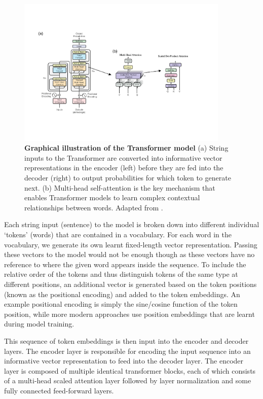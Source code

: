 \begin{figure}[ht]
\centering 
\includegraphics[width=0.9\textwidth]{Chapters/Background/Figs/transformer.pdf}
\caption{\textbf{Graphical illustration of the Transformer model} (a) String inputs to the Transformer are converted into informative vector representations in the encoder (left) before they are fed into the decoder (right) to output probabilities for which token to generate next. (b) Multi-head self-attention is the key mechanism that enables Transformer models to learn complex contextual relationships between words. Adapted from \cite{Vaswani2017}.}
\label{fig:transformer}
\end{figure}

Each string input (sentence) to the model is broken down into different individual `tokens' (words) that are contained in a vocabulary. For each word in the vocabulary, we generate its own learnt fixed-length vector representation. Passing these vectors to the model would not be enough though as these vectors have no reference to where the given word appears inside the sequence. To include the relative order of the tokens and thus distinguish tokens of the same type at different positions, an additional vector is generated based on the token positions (known as the positional encoding) and added to the token embeddings. An example positional encoding is simply the sine/cosine function of the token position, while more modern approaches use position embeddings that are learnt during model training.

This sequence of token embeddings is then input into the encoder and decoder layers. The encoder layer is responsible for encoding the input sequence into an informative vector representation to feed into the decoder layer. The encoder layer is composed of multiple identical transformer blocks, each of which consists of a multi-head scaled attention layer followed by layer normalization and some fully connected feed-forward layers.

